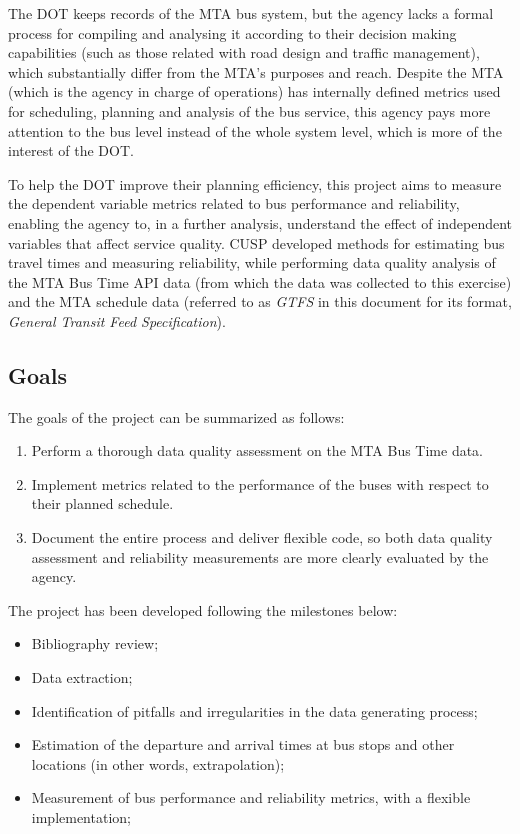 \documentclass[12pt]{report}
\begin{document}
The DOT keeps records of the MTA bus system, but the agency lacks a formal process for compiling and analysing it according to their decision making capabilities (such as those related with road design and traffic management), which substantially differ from the MTA's purposes and reach. Despite the MTA (which is the agency in charge of operations) has internally defined metrics used for scheduling, planning and analysis of the bus service, this agency pays more attention to the bus level instead of the whole system level, which is more of the interest of the DOT.
 
To help the DOT improve their planning efficiency, this project aims to measure the dependent variable metrics related to bus performance and reliability, enabling the agency to, in a further analysis, understand the effect of independent variables that affect service quality. CUSP developed methods for estimating bus travel times and measuring reliability, while performing data quality analysis of the MTA Bus Time API data (from which the data was collected to this exercise) and the MTA schedule data (referred to as \textit{GTFS} in this document for its format, \textit{General Transit Feed Specification}). 

\subsection{Goals}

The goals of the project can be summarized as follows:

\begin{enumerate}
\item Perform a thorough data quality assessment on the MTA Bus Time data.

\item Implement metrics related to the performance of the buses with respect to their planned schedule.

\item Document the entire process and deliver flexible code, so both data quality assessment and reliability measurements are more clearly evaluated by the agency.
\end{enumerate}


The project has been developed following the milestones below:

\begin{itemize}
\item Bibliography review; 
\item Data extraction; 
\item Identification of pitfalls and irregularities in the data generating process;
\item Estimation of the departure and arrival times at bus stops and other locations (in other words, extrapolation); 
\item Measurement of bus performance and reliability metrics, with a flexible implementation;
\end{itemize}
\end{document}
